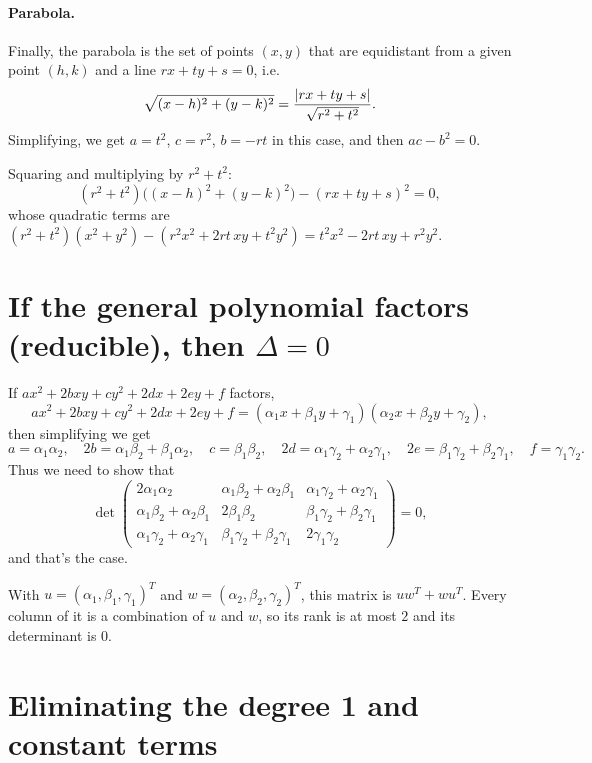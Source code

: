 \paragraph{Parabola.} Finally, the parabola is the set of points $(x,y)$ that are equidistant from a given point $(h,k)$ and a line $rx + ty + s = 0$, i.e.
\[
\sqrt{(x-h)^2 + (y-k)^2} = \frac{\left\lvert rx + ty + s\right\rvert}{\sqrt{r^2 + t^2}} .
\]
Simplifying, we get $a = t^2$, $c = r^2$, $b = -rt$ in this case, and then $ac - b^2 = 0$.

\begin{calc}
Squaring and multiplying by $r^2 + t^2$:
\[
(r^2 + t^2)\big((x-h)^2 + (y-k)^2\big) - (rx + ty + s)^2 = 0,
\]
whose quadratic terms are $(r^2 + t^2)(x^2 + y^2) - (r^2x^2 + 2rt\,xy + t^2y^2) = t^2x^2 - 2rt\,xy + r^2y^2$.
\end{calc}

\section{If the general polynomial factors (reducible), then $\Delta = 0$}

If $ax^2 + 2bxy + cy^2 + 2dx + 2ey + f$ factors,
\[
ax^2 + 2bxy + cy^2 + 2dx + 2ey + f = (\alpha_1 x + \beta_1 y + \gamma_1)(\alpha_2 x + \beta_2 y + \gamma_2),
\]
then simplifying we get
\[
a = \alpha_1\alpha_2, \quad
2b = \alpha_1\beta_2 + \beta_1\alpha_2, \quad
c = \beta_1\beta_2, \quad
2d = \alpha_1\gamma_2 + \alpha_2\gamma_1, \quad
2e = \beta_1\gamma_2 + \beta_2\gamma_1, \quad
f = \gamma_1\gamma_2 .
\]
Thus we need to show that
\[
\det \begin{pmatrix}
2\alpha_1\alpha_2 & \alpha_1\beta_2 + \alpha_2\beta_1 & \alpha_1\gamma_2 + \alpha_2\gamma_1 \\
\alpha_1\beta_2 + \alpha_2\beta_1 & 2\beta_1\beta_2 & \beta_1\gamma_2 + \beta_2\gamma_1 \\
\alpha_1\gamma_2 + \alpha_2\gamma_1 & \beta_1\gamma_2 + \beta_2\gamma_1 & 2\gamma_1\gamma_2
\end{pmatrix} = 0,
\]
and that's the case.

\begin{calc}
With $u = (\alpha_1, \beta_1, \gamma_1)^T$ and $w = (\alpha_2, \beta_2, \gamma_2)^T$, this matrix is $uw^T + wu^T$. Every column of it is a combination of $u$ and $w$, so its rank is at most $2$ and its determinant is $0$.
\end{calc}

\section{Eliminating the degree 1 and constant terms}

